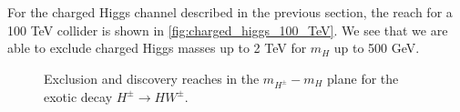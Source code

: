 For the charged Higgs channel described in the previous section, the reach for a 100 TeV collider is shown in \autoref{fig:charged_higgs_100_TeV}. We see that we are able to exclude charged Higgs masses up to 2 TeV for $m_H$ up to 500 GeV.
\strictpagecheck
\begin{figure}
  \begin{sidecaption}{Exclusion and discovery reaches in the $m_{H^\pm}-m_{H}$ plane for the exotic decay $H^\pm\rightarrow HW^\pm$.}
    
\label{fig:charged_higgs_100_TeV}
\end{sidecaption}
\end{figure}

